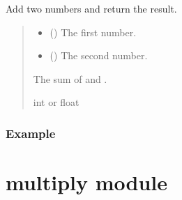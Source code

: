 \documentclass[letterpaper,10pt,english]{sphinxmanual}
\begin{document}
\begin{fulllineitems}
\label{\detokenize{add:add.add_numbers}}
\pysigstartsignatures
{}
\pysigstopsignatures
\sphinxAtStartPar
Add two numbers and return the result.
\begin{quote}\begin{description}
\begin{itemize}
\item {} 
\sphinxAtStartPar
{} () \sphinxhyphen{}\sphinxhyphen{} The first number.

\item {} 
\sphinxAtStartPar
{} () \sphinxhyphen{}\sphinxhyphen{} The second number.

\end{itemize}

\sphinxAtStartPar
The sum of  and .

\sphinxAtStartPar
int or float

\end{description}\end{quote}
\subsubsection*{Example}

\begin{sphinxVerbatim}[commandchars=\\\{\}]
 
\end{sphinxVerbatim}

\end{fulllineitems}


\sphinxstepscope


\section{multiply module}
\label{\detokenize{multiply:module-multiply}}\label{\detokenize{multiply:multiply-module}}\label{\detokenize{multiply::doc}}
\end{document}
